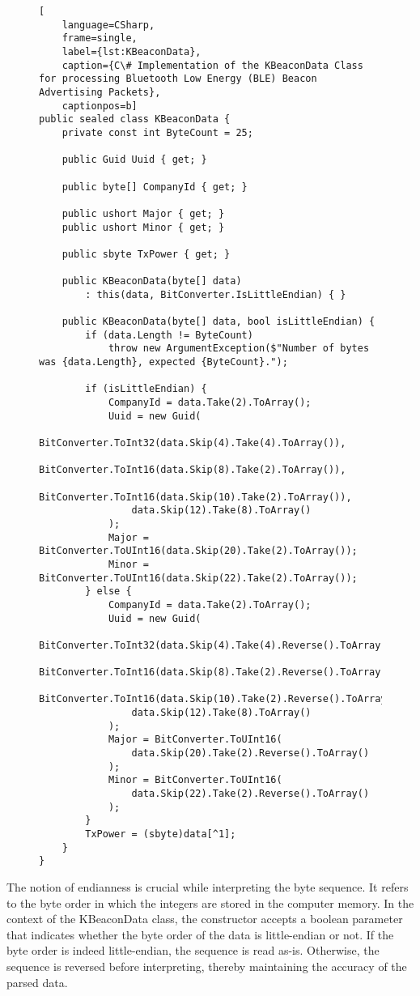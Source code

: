 \begin{figure}[h!]
\begin{lstlisting}[
	language=CSharp, 
	frame=single, 
	label={lst:KBeaconData},
	caption={C\# Implementation of the KBeaconData Class for processing Bluetooth Low Energy (BLE) Beacon Advertising Packets}, 
	captionpos=b] 
public sealed class KBeaconData {
	private const int ByteCount = 25;

	public Guid Uuid { get; }

	public byte[] CompanyId { get; }

	public ushort Major { get; }
	public ushort Minor { get; }

	public sbyte TxPower { get; }

	public KBeaconData(byte[] data) 
		: this(data, BitConverter.IsLittleEndian) { }

	public KBeaconData(byte[] data, bool isLittleEndian) {
		if (data.Length != ByteCount)
			throw new ArgumentException($"Number of bytes was {data.Length}, expected {ByteCount}.");

		if (isLittleEndian) {
			CompanyId = data.Take(2).ToArray();
			Uuid = new Guid(
				BitConverter.ToInt32(data.Skip(4).Take(4).ToArray()),
				BitConverter.ToInt16(data.Skip(8).Take(2).ToArray()),
				BitConverter.ToInt16(data.Skip(10).Take(2).ToArray()),
				data.Skip(12).Take(8).ToArray()
			);
			Major = BitConverter.ToUInt16(data.Skip(20).Take(2).ToArray());
			Minor = BitConverter.ToUInt16(data.Skip(22).Take(2).ToArray());
		} else {
			CompanyId = data.Take(2).ToArray();
			Uuid = new Guid(
				BitConverter.ToInt32(data.Skip(4).Take(4).Reverse().ToArray()),
				BitConverter.ToInt16(data.Skip(8).Take(2).Reverse().ToArray()),
				BitConverter.ToInt16(data.Skip(10).Take(2).Reverse().ToArray()),
				data.Skip(12).Take(8).ToArray()
			);
			Major = BitConverter.ToUInt16(
				data.Skip(20).Take(2).Reverse().ToArray()
			);
			Minor = BitConverter.ToUInt16(
				data.Skip(22).Take(2).Reverse().ToArray()
			);
		}
		TxPower = (sbyte)data[^1];
	}
}
\end{lstlisting}
\end{figure}

The notion of endianness is crucial while interpreting the byte sequence.
It refers to the byte order in which the integers are stored in the computer memory. In the context of the KBeaconData class, the constructor accepts a boolean parameter that indicates whether the byte order of the data is little-endian or not. If the byte order is indeed little-endian, the sequence is read as-is. Otherwise, the sequence is reversed before interpreting, thereby maintaining the accuracy of the parsed data.


